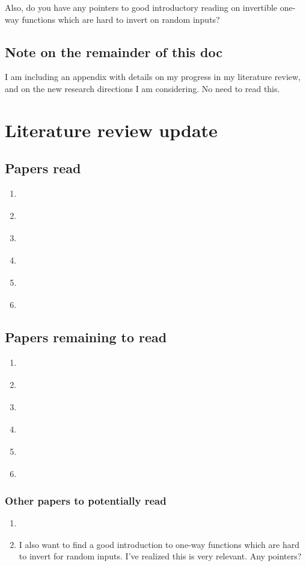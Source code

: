 \documentclass{article}
\begin{document}
Also, do you have any pointers to good introductory reading on invertible one-way functions which are hard to invert on random inputs?

\subsection{Note on the remainder of this doc}
I am including an appendix with details on my progress in my literature review, and on the new research directions I am considering.  No need to read this.

\appendix

\section{Literature review update}

\subsection{Papers read}

\begin{enumerate}
    \item \cite{jerrum1986}
    \item \cite{cooper1990}
    \item \cite{dagum1993}
    \item \cite{dagum1997optimal}
    \item \cite{ackerman2019computability}
    \item \cite{kwisthout2018approximate}
\end{enumerate}

\subsection{Papers remaining to read}
\begin{enumerate}
    \item \cite{akmal2022majority}
    \item \cite{tantau2022satisfaction}
    \item \cite{moitra2019approximate}
    \item \cite{aaronson2014equivalence}
    \item \cite{yamakami1999polynomial}
    \item \cite{feige2002relations}
\end{enumerate}

\subsubsection{Other papers to potentially read}
\begin{enumerate}
    \item \cite{li2021hierarchical}
    \item I also want to find a good introduction to one-way functions which are hard to invert for random inputs.  I’ve realized this is very relevant.  Any pointers?
\end{enumerate}
\end{document}
